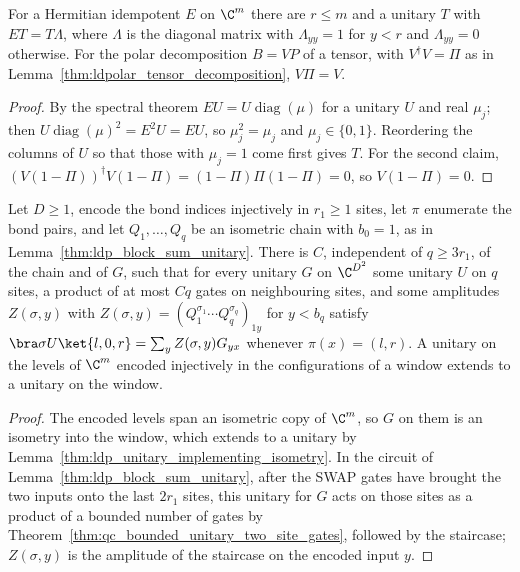 \begin{lemma}
    \label{lem:ldp_projector_basis}
    \leanok
    For a Hermitian idempotent $E$ on $\C^m$ there are $r\le m$ and a unitary
    $T$ with $ET=T\Lambda$, where $\Lambda$ is the diagonal matrix with
    $\Lambda_{yy}=1$ for $y<r$ and $\Lambda_{yy}=0$ otherwise. For the polar
    decomposition $B=VP$ of a tensor, with $V^\dagger V=\Pi$ as in
    Lemma~\ref{thm:ldpolar_tensor_decomposition}, $V\Pi=V$.
\end{lemma}
\begin{proof}
    \leanok
    By the spectral theorem $EU=U\operatorname{diag}(\mu)$ for a unitary $U$
    and real $\mu_j$; then $U\operatorname{diag}(\mu)^2=E^2U=EU$, so
    $\mu_j^2=\mu_j$ and $\mu_j\in\{0,1\}$. Reordering the columns of $U$ so
    that those with $\mu_j=1$ come first gives $T$. For the second claim,
    $(V(1-\Pi))^\dagger V(1-\Pi)=(1-\Pi)\Pi(1-\Pi)=0$, so $V(1-\Pi)=0$.
\end{proof}

\begin{lemma}
    \label{lem:ldp_block_unitary_gate}
    \leanok
    Let $D\ge1$, encode the bond indices injectively in $r_1\ge1$ sites, let $\pi$
    enumerate the bond pairs, and let $Q_1,\dots,Q_q$ be an isometric chain
    with $b_0=1$, as in Lemma~\ref{thm:ldp_block_sum_unitary}. There is $C$,
    independent of $q\ge3r_1$, of the chain and of $G$, such that for every
    unitary $G$ on $\C^{D^2}$ some unitary $U$ on $q$ sites, a product of at
    most $Cq$ gates on neighbouring sites, and some amplitudes $Z(\sigma,y)$
    with $Z(\sigma,y)=(Q_1^{\sigma_1}\cdots Q_q^{\sigma_q})_{1y}$ for $y<b_q$
    satisfy $\bra\sigma U\ket{l,0,r}=\sum_yZ(\sigma,y)G_{yx}$ whenever
    $\pi(x)=(l,r)$. A unitary on the levels of $\C^m$ encoded injectively in
    the configurations of a window extends to a unitary on the window.
\end{lemma}
\begin{proof}
    \leanok
    The encoded levels span an isometric copy of $\C^m$, so $G$ on them is an
    isometry into the window, which extends to a unitary by
    Lemma~\ref{thm:ldp_unitary_implementing_isometry}. In the circuit of
    Lemma~\ref{thm:ldp_block_sum_unitary}, after the SWAP gates have brought
    the two inputs onto the last $2r_1$ sites, this unitary for $G$ acts on
    those sites as a product of a bounded number of gates by
    Theorem~\ref{thm:qc_bounded_unitary_two_site_gates}, followed by the
    staircase; $Z(\sigma,y)$ is the amplitude of the staircase on the encoded
    input $y$.
\end{proof}

